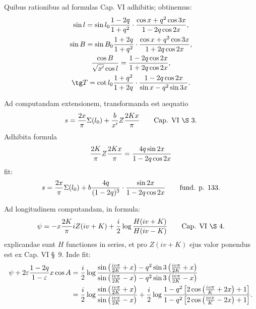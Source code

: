 \begingroup\small
{}

Quibus rationibus ad formulas Cap. VI adhibitis; obtinemus:
\[
\begin{gathered}
\sin l=\sin l_0{1-2q\over1+q^2}\cdot{\cos x+q^2\cos3x\over1-2q\cos2x},\\
\sin B=\sin B_0{1+2q\over1+q^2}\cdot{\cos x+q^2\cos3x\over1+2q\cos2x},\\
{\cos B\over\sqrt{x'}\cos l}={1-2q\cos2x\over1+2q\cos2x},\\
\tg T=\cot l_0{1+q^2\over1+2q}\cdot{1-2q\cos2x\over\sin x-q^2\sin3x}.
\end{gathered}
\]


Ad computandam extensionem, transformanda est aequatio
\[
 s={2x\over\pi}\Sigma(l_0)+{b\over x'}Z{2Kx\over\pi}
 \qquad\text{Cap. VI \S\ 3.}
\]
Adhibita formula
\[
 {2K\over\pi}Z{2Kx\over\pi}={4q\sin2x\over1-2q\cos2x}
\]
fit:
\[
 s={2x\over\pi}\Sigma(l_0)+b{4q\over(1-2q)^3}\cdot{\sin2x\over1-2q\cos2x}
 \qquad\text{fund. p. 133.}
\]


Ad longitudinem computandam, in formula:
\[
 \psi=-x{2K\over\pi}iZ(iv+K)+{i\over2}\log{H(iv+K)\over H(iv-K)}
 \qquad\text{Cap. VI \S\ 4.}
\]
explicandae sunt $H$ functiones in series, et pro $Z(iv+K)$ ejus valor ponendus est ex Cap. VI \S\ 9.
Inde fit:
\[
\begin{aligned}
\psi+2\varepsilon{1-2q\over1-\varepsilon}x\cos A
&={i\over2}\log{\sin\left({iv\pi\over2K}+x\right)-q^2\sin3\left({iv\pi\over2K}+x\right)
\over
\sin\left({iv\pi\over2K}-x\right)-q^2\sin3\left({iv\pi\over2K}-x\right)}\\
&={i\over2}\log{\sin\left({iv\pi\over2K}+x\right)\over\sin\left({iv\pi\over2K}-x\right)}
+{i\over2}\log{1-q^2\left[2\cos\left({iv\pi\over K}+2x\right)+1\right]
\over
1-q^2\left[2\cos\left({iv\pi\over K}-2x\right)+1\right]}.
\end{aligned}
\]
\endgroup
